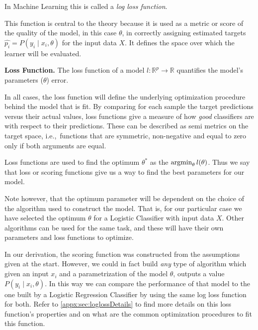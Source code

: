 In Machine Learning this is called a \emph{log loss function}.

This function is central to the theory because it is used as a metric or score of the quality of the model, in this case $\theta$, in correctly assigning estimated targets $ {\hat{p_i}} = P(y_i \mid x_i,\theta)$ for the input data $X$.
It defines the space over which the learner will be evaluated.

\begin{definition}{\textbf{Loss Function.}}
The loss function of a model $l: \mathbb{R}^{ p} \rightarrow  \mathbb{R} $ quantifies the model's parameters ($\theta$) error.
\end{definition}

In all cases, the loss function will define the underlying optimization procedure behind the model that is fit.
By comparing for each sample the target predictions versus their actual values, loss functions give a measure of how \textit{good} classifiers are with respect to their predictions.
These can be described as semi metrics on the target space, i.e.,\ functions that are symmetric, non-negative and equal to zero only if both arguments are equal.

Loss functions are used to find the optimum $\theta^*$ as the $\operatorname*{argmin}_{\theta} l(\theta) $.
Thus we say that loss or scoring functions give us a way to find the best parameters for our model.

Note however, that the optimum parameter will be dependent on the choice of the algorithm used to construct the model.
That is, for our particular case we have selected the optimum $\theta$ for a Logistic Classifier with input data $X$.
Other algorithms can be used for the same task, and these will have their own parameters and loss functions to optimize.

In our derivation, the scoring function was constructed from the assumptions given at the start.
However, we could in fact build \textit{any} type of algorithm which given an input $x_i$ and a parametrization of the model $\theta$, outputs a value $P(y_i \mid x_i,\theta)$.
In this way we can compare the performance of that model to the one built by a Logistic Regression Classifier by using the same log loss function for both.
Refer to \cref{appx:sec:loglossDetails} to find more details on this loss function's properties and on what are the common optimization procedures to fit this function.

